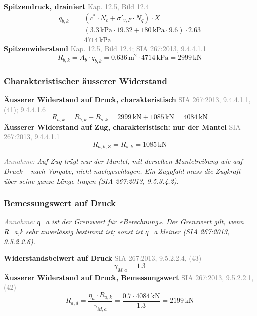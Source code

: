 \documentclass[11pt,a4paper]{article}
\newcommand{\normref}[1]{{\small\textcolor{gray}{#1}}}
\newcommand{\hinweis}[2]{\par\noindent\textcolor{gray}{\textit{#1:}} \textit{#2}\par}
\begin{document}
\noindent\textbf{Spitzendruck, drainiert} \hfill \normref{Kap. 12.5, Bild 12.4}
\begin{equation*}
\begin{aligned}
  q_{b,k} &= \left(c^{*} \cdot N_c + \sigma'_{v,F} \cdot N_q\right) \cdot X \\
  &= \left(3.3\,\mathrm{kPa} \cdot 19.32 + 180\,\mathrm{kPa} \cdot 9.6\right) \cdot 2.63 \\
  &= 4714\,\mathrm{kPa}
\end{aligned}
\end{equation*}
\noindent\textbf{Spitzenwiderstand} \hfill \normref{Kap. 12.5, Bild 12.4; SIA 267:2013, 9.4.4.1.1}
\begin{equation*}
R_{b,k} = A_b \cdot q_{b,k} = 0.636\,\mathrm{m}^{2} \cdot 4714\,\mathrm{kPa} = 2999\,\mathrm{kN}
\end{equation*}
\subsubsection{Charakteristischer äusserer Widerstand}
\noindent\textbf{Äusserer Widerstand auf Druck, charakteristisch} \hfill \normref{SIA 267:2013, 9.4.4.1.1, (41); 9.4.4.1.6}
\begin{equation*}
R_{a,k} = R_{b,k} + R_{s,k} = 2999\,\mathrm{kN} + 1085\,\mathrm{kN} = 4084\,\mathrm{kN}
\end{equation*}
\noindent\textbf{Äusserer Widerstand auf Zug, charakteristisch: nur der Mantel} \hfill \normref{SIA 267:2013, 9.4.4.1.1}
\begin{equation*}
R_{a,k,Z} = R_{s,k} = 1085\,\mathrm{kN}
\end{equation*}
\hinweis{Annahme}{Auf Zug trägt nur der Mantel, mit derselben Mantelreibung wie auf Druck – nach Vorgabe, nicht nachgeschlagen. Ein Zugpfahl muss die Zugkraft über seine ganze Länge tragen (SIA 267:2013, 9.5.3.4.2).}
\subsubsection{Bemessungswert auf Druck}
\hinweis{Annahme}{η\_a ist der Grenzwert für «Berechnung». Der Grenzwert gilt, wenn R\_a,k sehr zuverlässig bestimmt ist; sonst ist η\_a kleiner (SIA 267:2013, 9.5.2.2.6).}
\noindent\textbf{Widerstandsbeiwert auf Druck} \hfill \normref{SIA 267:2013, 9.5.2.2.4, (43)}
\begin{equation*}
\gamma_{M,a} = 1.3
\end{equation*}
\noindent\textbf{Äusserer Widerstand auf Druck, Bemessungswert} \hfill \normref{SIA 267:2013, 9.5.2.2.1, (42)}
\begin{equation*}
R_{a,d} = \frac{\eta_a \cdot R_{a,k}}{\gamma_{M,a}} = \frac{0.7 \cdot 4084\,\mathrm{kN}}{1.3} = 2199\,\mathrm{kN}
\end{equation*}
\end{document}
